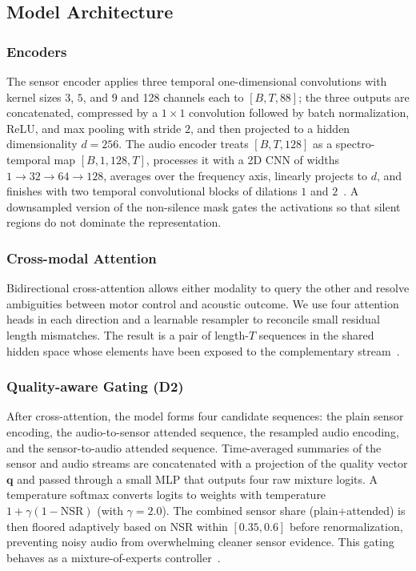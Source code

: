 \documentclass[sigconf,review,anonymous]{acmart}
\begin{document}
\subsection{Model Architecture}
\label{subsec:arch}
\subsubsection{Encoders}
The sensor encoder applies three temporal one-dimensional convolutions with kernel sizes $3$, $5$, and $9$ and 128 channels each to $[B,T,88]$; the three outputs are concatenated, compressed by a $1{\times}1$ convolution followed by batch normalization, ReLU, and max pooling with stride $2$, and then projected to a hidden dimensionality $d{=}256$. The audio encoder treats $[B,T,128]$ as a spectro-temporal map $[B,1,128,T]$, processes it with a 2D CNN of widths $1\!\to\!32\!\to\!64\!\to\!128$, averages over the frequency axis, linearly projects to $d$, and finishes with two temporal convolutional blocks of dilations $1$ and $2$~\cite{Bai2018TCN}. A downsampled version of the non-silence mask gates the activations so that silent regions do not dominate the representation.

\subsubsection{Cross-modal Attention}
Bidirectional cross-attention allows either modality to query the other and resolve ambiguities between motor control and acoustic outcome. We use four attention heads in each direction and a learnable resampler to reconcile small residual length mismatches. The result is a pair of length-$T$ sequences in the shared hidden space whose elements have been exposed to the complementary stream~\cite{Vaswani2017,Lu2019ViLBERT}.

\subsubsection{Quality-aware Gating (D2)}
\label{subsec:gating}
After cross-attention, the model forms four candidate sequences: the plain sensor encoding, the audio-to-sensor attended sequence, the resampled audio encoding, and the sensor-to-audio attended sequence. Time-averaged summaries of the sensor and audio streams are concatenated with a projection of the quality vector $\mathbf{q}$ and passed through a small MLP that outputs four raw mixture logits. A temperature softmax converts logits to weights with temperature $1+\gamma(1{-}\mathrm{NSR})$ (with $\gamma{=}2.0$). The combined sensor share (plain+attended) is then floored adaptively based on NSR within $[0.35,0.6]$ before renormalization, preventing noisy audio from overwhelming cleaner sensor evidence. This gating behaves as a mixture-of-experts controller~\cite{Jacobs1991MoE,Shazeer2017MoE}.
\end{document}
